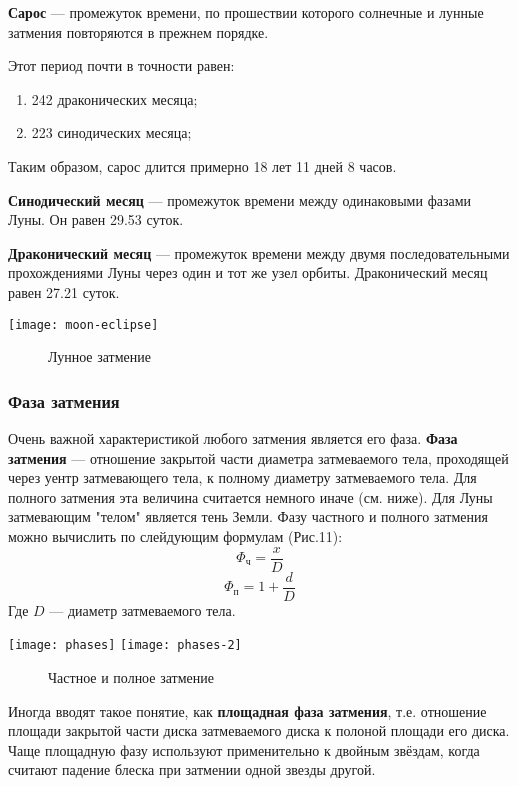 \textbf{Сарос} --- промежуток  времени, по прошествии которого солнечные и 
лунные затмения повторяются в прежнем порядке.

Этот период почти в точности равен:
\begin{enumerate}
\item 242 драконических месяца;
\item 223 синодических месяца;
\end{enumerate}

Таким образом, сарос длится примерно 18 лет 11 дней 8 часов.

\textbf{Синодический месяц} --- промежуток времени между одинаковыми фазами 
Луны. Он равен 29.53 суток.

\textbf{Драконический месяц} --- промежуток времени между двумя 
последовательными прохождениями Луны через один и тот же узел орбиты. 
Драконический месяц равен 27.21 суток.
\begin{center}
\texttt{[image: moon-eclipse]}
\begin{figure}[h!]
\caption{Лунное затмение}
\end{figure}
\end{center}
\subsubsection{Фаза затмения}
Очень важной характеристикой любого затмения является его фаза. \textbf{Фаза 
затмения} --- отношение закрытой части диаметра затмеваемого тела, проходящей 
через уентр затмевающего тела, к полному диаметру затмеваемого тела. Для 
полного затмения эта величина считается немного иначе (см. ниже). Для Луны 
затмевающим "телом" является тень Земли. Фазу частного и полного затмения можно 
вычислить по слейдующим формулам (Рис.11):
\begin{equation}\Phi_{\text{ч}}=\frac{x}{D}
\end{equation}  \begin{equation}\Phi_{\text{п}}=1+\frac{d}{D}
\end{equation}
Где $D$ --- диаметр затмеваемого тела.
\begin{center}
\texttt{[image: phases]}
\texttt{[image: phases-2]}
\begin{figure}[h!]
\caption{Частное и полное затмение}
\end{figure}
\end{center}

Иногда вводят такое понятие, как \textbf{площадная фаза затмения}, т.е. 
отношение площади закрытой части диска затмеваемого диска к полоной площади его 
диска. Чаще площадную фазу используют применительно к двойным звёздам, когда 
считают падение блеска при затмении одной звезды другой.
